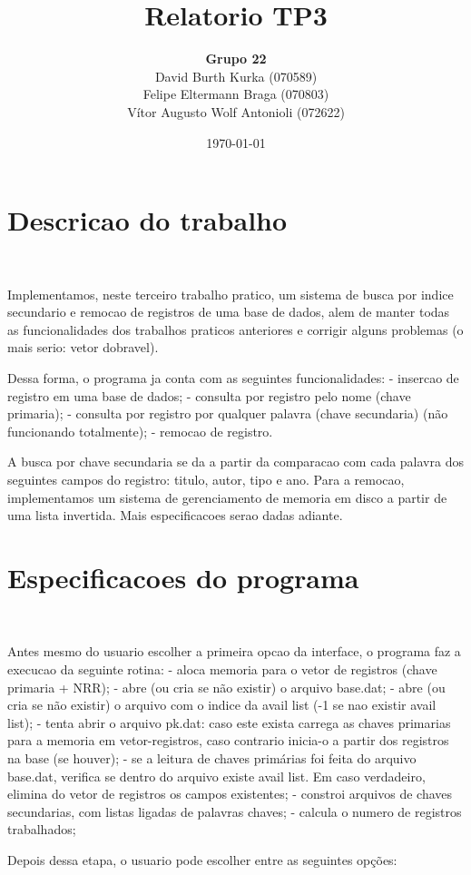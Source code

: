 \documentclass{article}
\title{\textbf{Relatorio TP3}}
\author{\textbf{Grupo 22} \\
  David Burth Kurka (070589) \\
  Felipe Eltermann Braga (070803) \\
  Vítor Augusto Wolf Antonioli (072622)}
\date{\today}
\begin{document}
\maketitle

\section{Descricao do trabalho}\

Implementamos, neste terceiro trabalho pratico, um sistema de busca por indice secundario e remocao de registros de uma base de dados, alem de manter todas as funcionalidades dos trabalhos praticos anteriores e corrigir alguns problemas (o mais serio: vetor dobravel).

Dessa forma, o programa ja conta com as seguintes funcionalidades: 
- insercao de registro em uma base de dados; 
- consulta por registro pelo nome (chave primaria); 
- consulta por registro por qualquer palavra (chave secundaria) (não funcionando totalmente); 
- remocao de registro.

A busca por chave secundaria se da a partir da comparacao com cada palavra dos seguintes campos do registro: titulo, autor, tipo e ano. Para a remocao, implementamos um sistema de gerenciamento de memoria em disco a partir de uma lista invertida. Mais especificacoes serao dadas adiante.

\section{Especificacoes do programa}\

Antes mesmo do usuario escolher a primeira opcao da interface, o programa faz a execucao da seguinte rotina: 
- aloca memoria para o vetor de registros (chave primaria + NRR); 
- abre (ou cria se não existir) o arquivo base.dat;
- abre (ou cria se não existir) o arquivo com o indice da avail list (-1 se nao existir avail list);
- tenta abrir o arquivo pk.dat: caso este exista carrega as chaves primarias para a memoria em vetor-registros, caso contrario inicia-o a partir dos registros na base (se houver);
- se a leitura de chaves primárias foi feita do arquivo base.dat, verifica se dentro do arquivo existe avail list. Em caso verdadeiro, elimina do vetor de registros os campos existentes;
- constroi arquivos de chaves secundarias, com listas ligadas de palavras chaves;
- calcula o numero de registros trabalhados;


Depois dessa etapa, o usuario pode escolher entre as seguintes opções:
\end{document}
